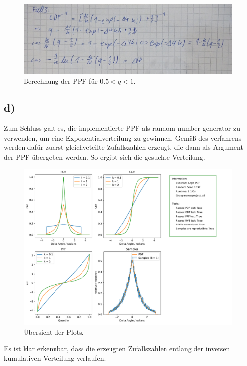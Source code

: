     \begin{figure}
        \centering
        \includegraphics[width=\textwidth]{c2.pdf}
        \caption{Berechnung der PPF für $0.5 < q < 1$.}
        \label{fig:fallzwei}
    \end{figure}
    \FloatBarrier

\subsection{d)}
    Zum Schluss galt es, die implementierte PPF als random number generator zu verwenden, um eine Exponentialverteilung zu gewinnen. Gemäß des verfahrens werden dafür 
    zuerst gleichveteilte Zufallszahlen erzeugt, die dann als Argument der PPF übergeben werden. So ergibt sich die gesuchte Verteilung.\\
    \begin{figure}
        \includegraphics[width=\textwidth]{exercise_angle_pdf.pdf}
        \caption{Übersicht der Plots.}
        \label{fig:ubersicht}
    \end{figure}
    \FloatBarrier

    \noindent Es ist klar erkennbar, dass die erzeugten Zufallszahlen entlang der inversen kumulativen Verteilung verlaufen. 
